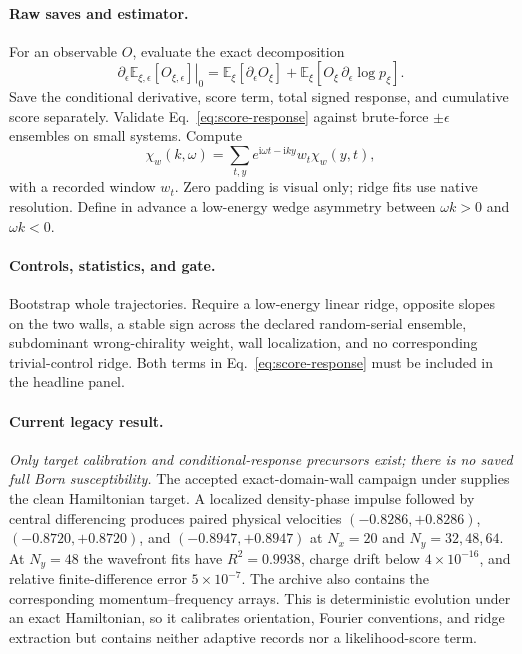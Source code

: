 \documentclass[aps,prx,twocolumn,floatfix,nofootinbib,superscriptaddress,longbibliography]{revtex4-2}
\newcommand{\ii}{\boldsymbol{\mathrm{i}}}
\newcommand{\E}{\mathbb{E}}
\begin{document}
\paragraph*{Raw saves and estimator.}
For an observable $O$, evaluate the exact decomposition
\begin{equation}
 \left.\partial_\epsilon\E_{\xi,\epsilon}[O_{\xi,\epsilon}]\right|_0
 =\E_\xi[\partial_\epsilon O_\xi]
 +\E_\xi[O_\xi\,\partial_\epsilon\log p_\xi].
 \label{eq:score-response}
\end{equation}
Save the conditional derivative, score term, total signed response, and cumulative score
separately.  Validate Eq.~\eqref{eq:score-response} against brute-force $\pm\epsilon$
ensembles on small systems.  Compute
\begin{equation}
 \chi_w(k,\omega)=\sum_{t,y}e^{\ii\omega t-\ii ky}w_t\chi_w(y,t),
\end{equation}
with a recorded window $w_t$.  Zero padding is visual only; ridge fits use native
resolution.  Define in advance a low-energy wedge asymmetry between $\omega k>0$ and
$\omega k<0$.

\paragraph*{Controls, statistics, and gate.}
Bootstrap whole trajectories.  Require a low-energy linear ridge, opposite slopes on the
two walls, a stable sign across the declared random-serial ensemble, subdominant wrong-chirality
weight, wall localization, and no corresponding trivial-control ridge.  Both terms in
Eq.~\eqref{eq:score-response} must be included in the headline panel.

\paragraph*{Current legacy result.}
\emph{Only target calibration and conditional-response precursors exist; there is no saved
full Born susceptibility.}
The accepted exact-domain-wall campaign under
 supplies the clean
Hamiltonian target.  A localized density-phase impulse followed by central differencing
produces paired physical velocities $(-0.8286,+0.8286)$, $(-0.8720,+0.8720)$, and
$(-0.8947,+0.8947)$ at $N_x=20$ and $N_y=32,48,64$.  At $N_y=48$ the wavefront fits have
$R^2=0.9938$, charge drift below $4\times10^{-16}$, and relative finite-difference error
$5\times10^{-7}$.  The archive also contains the corresponding momentum--frequency arrays.
This is deterministic evolution under an exact Hamiltonian, so it calibrates orientation,
Fourier conventions, and ridge extraction but contains neither adaptive records nor a
likelihood-score term.
\end{document}
